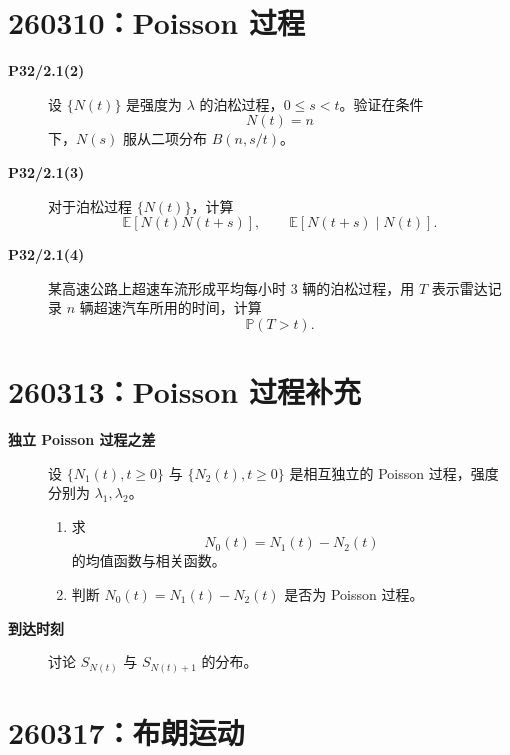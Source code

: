 \documentclass[12pt,a4paper,openany]{ctexrep}
\theoremstyle{definition}
\newcommand{\E}{\mathbb{E}}
\newcommand{\Pp}{\mathbb{P}}
\begin{document}
\section{260310：Poisson 过程}

\begin{description}
	\item[\textbf{P32/2.1(2)}] 设 $\{N(t)\}$ 是强度为 $\lambda$ 的泊松过程，$0\le s<t$。验证在条件
	\[
	N(t)=n
	\]
	下，$N(s)$ 服从二项分布 $B(n,s/t)$。
	\item[\textbf{P32/2.1(3)}] 对于泊松过程 $\{N(t)\}$，计算
	\[
	\E[N(t)N(t+s)],\qquad
	\E[N(t+s)\mid N(t)].
	\]
	\item[\textbf{P32/2.1(4)}] 某高速公路上超速车流形成平均每小时 $3$ 辆的泊松过程，用 $T$ 表示雷达记录 $n$ 辆超速汽车所用的时间，计算
	\[
	\Pp(T>t).
	\]
\end{description}

\section{260313：Poisson 过程补充}

\begin{description}
	\item[\textbf{独立 Poisson 过程之差}] 设 $\{N_1(t),t\ge0\}$ 与 $\{N_2(t),t\ge0\}$ 是相互独立的 Poisson 过程，强度分别为 $\lambda_1,\lambda_2$。
	\begin{enumerate}[label=(\arabic*)]
		\item 求
		\[
		N_0(t)=N_1(t)-N_2(t)
		\]
		的均值函数与相关函数。
		\item 判断 $N_0(t)=N_1(t)-N_2(t)$ 是否为 Poisson 过程。
	\end{enumerate}
	\item[\textbf{到达时刻}] 讨论 $S_{N(t)}$ 与 $S_{N(t)+1}$ 的分布。
\end{description}

\section{260317：布朗运动}
\end{document}
